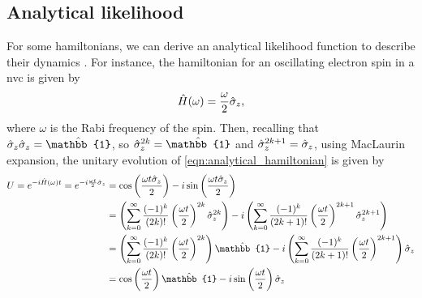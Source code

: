 \subsection{Analytical likelihood}\label{sec:analytical_likelihood}
For some \glspl{hamiltonian}, we can derive an analytical \gls{likelihood} function to describe their dynamics
    \cite{sergeevich2011characterization, ferrie2013best}.
For instance, the \gls{hamiltonian} for an oscillating electron spin in a \acrlong{nvc} 
    is given by
    \begin{equation}
        \label{eqn:analytical_hamiltonian}
        \hat{H}(\omega) = \frac{\omega}{2} \hat{\sigma}_z,
    \end{equation}
    where $\omega$ is the Rabi frequency of the spin. 
Then, recalling that $\s_z \s_z = \hat{\mathbb{1}}$, so $\s_z^{2k}=\hat{\mathbb{1}}$ and $\hat{\sigma}_z^{2k+1} = \hat{\sigma}_z$, 
    using MacLaurin expansion, the unitary evolution of \cref{eqn:analytical_hamiltonian} is given by 
\begin{align}
    \begin{split}
        U = e^{-i \hat{H}(\omega)t} = e^{-i \frac{\omega t}{2} \s_z}  
        &= \cos\bk{ \frac{\omega t \s_z}{2}} 
        - i \sin\bk{ \frac{\omega t \s_z}{2}} \\
        &= \bk{ \sum\limits_{k=0}^{\infty} \frac{(-1)^k}{(2k)!} \bk{ \frac{\omega t}{2} }^{2k} \s_z^{2k}  }
        - i \bk{\sum\limits_{k=0}^{\infty} \frac{(-1)^k}{(2k+1)!} \bk{ \frac{\omega t}{2} }^{2k+1} \s_z^{2k+1}} \\
        &=  \bk{\sum\limits_{k=0}^{\infty} \frac{(-1)^k}{(2k)!} \bk{ \frac{\omega t}{2} }^{2k}} \hat{\mathbb{1}} 
        - i \bk{\sum\limits_{k=0}^{\infty} \frac{(-1)^k}{(2k+1)!} \bk{ \frac{\omega t}{2} }^{2k+1} } \s_z \\
        &= \cos\bk{\frac{\omega t}{2}}\hat{\mathbb{1}} - i \sin\bk{\frac{\omega t}{2}} \s_z
    \end{split}
\end{align}
    
